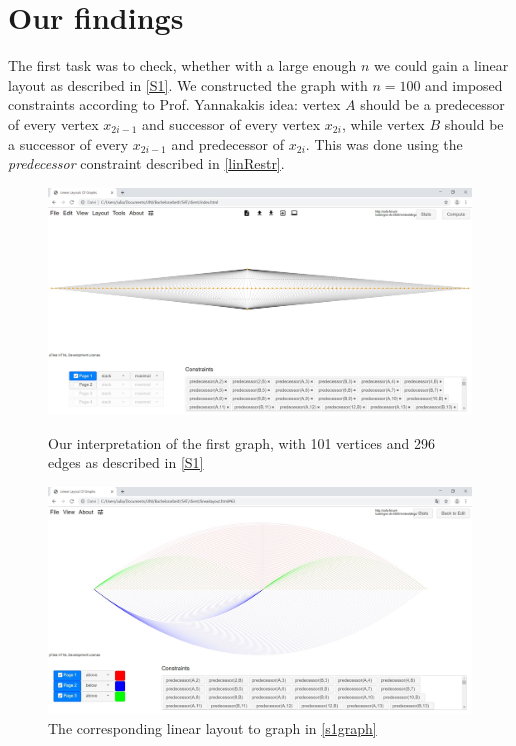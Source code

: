 \section{Our findings}
The first task was to check, whether with a large enough $n$  we could gain a linear layout as described in \autoref{S1}. We constructed the graph with $n = 100$ and imposed constraints according to Prof. Yannakakis idea: vertex $A$ should be a predecessor of every vertex $x_{2i-1}$ and successor of every vertex $x_{2i}$, while vertex $B$ should be a successor of every $x_{2i-1}$ and predecessor of $x_{2i}$. This was done using the \textit{predecessor} constraint described in \autoref{linRestr}.\\
\begin{figure}[h!]
\begin{center}
\includegraphics[width=1\textwidth]{figures/skeletonGraph101-296.jpg}
\caption{Our interpretation of the first graph, with 101 vertices and 296 edges as described in \autoref{S1}\label{s1graph}}
\vspace*{24px}
\includegraphics[width=1\textwidth]{figures/skeletonGraph101-296-Solution.jpg}
\caption{The corresponding linear layout to graph in \autoref{s1graph}\label{s1sol}}
\end{center}
\end{figure}

